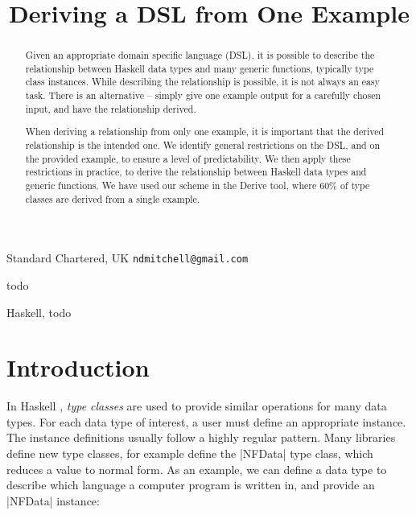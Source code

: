 \documentclass[preprint]{sigplanconf}
\begin{document}
\copyrightdata{[to be supplied]}

\titlebanner{\today{} - \currenttime{}}        %
\preprintfooter{}   %

\title{Deriving a DSL from One Example}

           {Standard Chartered, UK}
           {\verb"ndmitchell@gmail.com"}

\maketitle

\begin{abstract}
Given an appropriate domain specific language (DSL), it is possible to describe the relationship between Haskell data types and many generic functions, typically type class instances. While describing the relationship is possible, it is not always an easy task. There is an alternative -- simply give one example output for a carefully chosen input, and have the relationship derived.

When deriving a relationship from only one example, it is important that the derived relationship is the intended one. We identify general restrictions on the DSL, and on the provided example, to ensure a level of predictability. We then apply these restrictions in practice, to derive the relationship between Haskell data types and generic functions. We have used our scheme in the Derive tool, where 60\% of type classes are derived from a single example.
\end{abstract}


\terms
todo

\keywords
Haskell, todo

\section{Introduction}
\label{sec:introduction}

In Haskell \cite{haskell}, \textit{type classes} \cite{wadler:type_classes} are used to provide similar operations for many data types. For each data type of interest, a user must define an appropriate instance. The instance definitions usually follow a highly regular pattern. Many libraries define new type classes, for example \citet{trinder:strategies} define the |NFData| type class, which reduces a value to normal form. As an example, we can define a data type to describe which language a computer program is written in, and provide an |NFData| instance:
\end{document}
